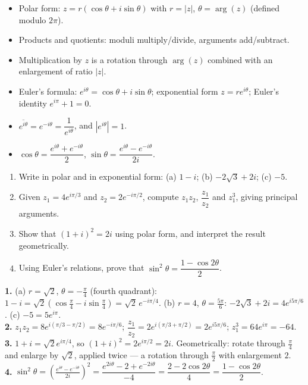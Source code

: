 \documentclass[11pt]{article}
\begin{document}
\begin{aretenir}
\begin{itemize}
\item Polar form: $z = r(\cos\theta + i\sin\theta)$ with $r = |z|$, $\theta = \arg(z)$ (defined modulo $2\pi$).
\item Products and quotients: moduli multiply/divide, arguments add/subtract.
\item Multiplication by $z$ is a rotation through $\arg(z)$ combined with an enlargement of ratio $|z|$.
\item Euler's formula: $e^{i\theta} = \cos\theta + i\sin\theta$; exponential form $z = re^{i\theta}$; Euler's identity $e^{i\pi} + 1 = 0$.
\item $\overline{e^{i\theta}} = e^{-i\theta} = \dfrac{1}{e^{i\theta}}$, and $|e^{i\theta}| = 1$.
\item $\cos\theta = \dfrac{e^{i\theta} + e^{-i\theta}}{2}$, \quad $\sin\theta = \dfrac{e^{i\theta} - e^{-i\theta}}{2i}$.
\end{itemize}
\end{aretenir}

\begin{exercice}[Practice]
\begin{enumerate}
\item Write in polar and in exponential form: (a) $1 - i$; (b) $-2\sqrt{3} + 2i$; (c) $-5$.
\item Given $z_1 = 4e^{i\pi/3}$ and $z_2 = 2e^{-i\pi/2}$, compute $z_1z_2$, $\dfrac{z_1}{z_2}$ and $z_1^3$, giving principal arguments.
\item Show that $(1 + i)^2 = 2i$ using polar form, and interpret the result geometrically.
\item Using Euler's relations, prove that $\sin^2\theta = \dfrac{1 - \cos 2\theta}{2}$.
\end{enumerate}
\end{exercice}

\begin{corrige}[Exercise 1]
\textbf{1.} (a) $r = \sqrt{2}$, $\theta = -\tfrac{\pi}{4}$ (fourth quadrant): $1 - i = \sqrt{2}\left(\cos\tfrac{\pi}{4} - i\sin\tfrac{\pi}{4}\right) = \sqrt{2}\,e^{-i\pi/4}$. (b) $r = 4$, $\theta = \tfrac{5\pi}{6}$: $-2\sqrt{3} + 2i = 4e^{i5\pi/6}$. (c) $-5 = 5e^{i\pi}$.\\
\textbf{2.} $z_1z_2 = 8e^{i(\pi/3 - \pi/2)} = 8e^{-i\pi/6}$; $\dfrac{z_1}{z_2} = 2e^{i(\pi/3 + \pi/2)} = 2e^{i5\pi/6}$; $z_1^3 = 64e^{i\pi} = -64$.\\
\textbf{3.} $1 + i = \sqrt{2}e^{i\pi/4}$, so $(1+i)^2 = 2e^{i\pi/2} = 2i$. Geometrically: rotate through $\tfrac{\pi}{4}$ and enlarge by $\sqrt{2}$, applied twice — a rotation through $\tfrac{\pi}{2}$ with enlargement $2$.\\
\textbf{4.} $\sin^2\theta = \left(\tfrac{e^{i\theta} - e^{-i\theta}}{2i}\right)^2 = \dfrac{e^{2i\theta} - 2 + e^{-2i\theta}}{-4} = \dfrac{2 - 2\cos 2\theta}{4} = \dfrac{1 - \cos 2\theta}{2}$.
\end{corrige}
\end{document}
